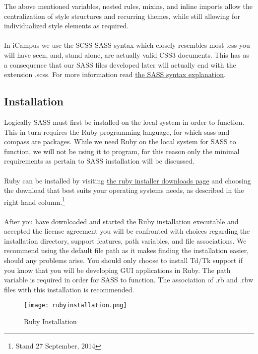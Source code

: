 \noindent
The above mentioned variables, nested rules, mixins, and inline imports allow the centralization of style structures and recurring themes, while still allowing for individualized style elements as required.\\
\\
In iCampus we use the SCSS SASS syntax which closely resembles most .css you will have seen, and, stand alone, are actually valid CSS3 documents. This has as a consequence that our SASS files developed later will actually end with the extension .scss. For more information read \href{http://sass-lang.com/documentation/file.SASS_REFERENCE.html#syntax}{the SASS syntax explanation}.

\subsection{Installation}

Logically SASS must first be installed on the local system in order to function. This in turn requires the Ruby programming language, for which sass and compass are packages. While we need Ruby on the local system for SASS to function, we will not be using it to program, for this reason only the minimal requirements as pertain to SASS installation will be discussed.\\
\\
Ruby can be installed by visiting \href{http://www.rubyinstaller.org/downloads/}{the ruby installer downloads page} and choosing the download that best suits your operating systems needs, as described in the right hand column.\footnote{Stand 27 September, 2014}\\
\\
After you have downloaded and started the Ruby installation executable and accepted the license agreement you will be confronted with choices regarding the installation directory, support features, path variables, and file associations. We recommend using the default file path as it makes finding the installation easier, should any problems arise. You should only choose to install Td/Tk support if you know that you will be developing GUI applications in Ruby. The path variable is required in order for SASS to function. The association of .rb and .rbw files with this installation is recommended.

\begin{figure}[h] 
	\centering
	\texttt{[image: rubyinstallation.png]}
	\caption{Ruby Installation}
	\label{fig:rubyinstallation}
\end{figure}

